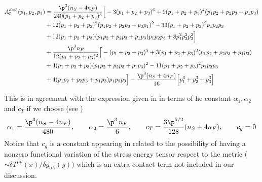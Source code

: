 \documentclass[a4paper,11pt,openright,twoside]{book}
\let\a=\alpha   \let\b=\beta   \let\g=\gamma   \let\d=\delta
\numberwithin{equation}{section}
\begin{document}
{{\begin{align}
	A_{5}^{d=3}(p_1,p_2,p_3)&=\frac{\p^3(n_S-4n_F)}{240(p_1+p_2+p_3)^3}\Big[-3(p_1+p_2+p_3)^6+9(p_1+p_2+p_3)^4(p_1 p_2+p_2 p_3+p_1 p_3)\notag\\
	&+12(p_1+p_2+p_3)^2(p_1 p_2+p_2p_3+p_3 p_1)^2-33(p_1+p_2+p_3)^2p_1p_2p_3\notag\\
	&+12(p_1+p_2+p_3)(p_1p_2+p_2p_3+p_1p_3)p_1p_2p_3+8p_1^2p_2^2p_3^2\Big]\notag\\
	&+\frac{\p^3n_F}{12(p_1+p_2+p_3)^2}\Big[-(p_1+p_2+p_3)^5+3(p_1+p_2+p_3)^3(p_1p_2+p_2p_3+p_1p_3)\notag\\
	&+4(p_1+p_2+p_3)(p_1p_2+p_2p_3+p_1p_3)^2-11(p_1+p_2+p_3)^2p_1p_2p_3\notag\\
	&+4(p_1p_2+p_2p_3+p_1p_3)p_1p_2p_3\Big]-\frac{\p^3(n_S+4n_F)}{16}\Big[p_1^3+p_2^3+p_3^3\Big]
\end{align}

This is in agreement with the expression given in \cite{Bzowski:2013sza} in terms of he constant $\a_1,\a_2$ and $c_T$ if we choose 
(see \cite{Bzowski:2013sza})
\begin{align}
	\a_1=\frac{\p^3(n_S-4n_F)}{480}, \qquad \a_2=\frac{\p^3\,n_F}{6}, \qquad c_T=\frac{3\p^{5/2}}{128}(n_S+4n_F), \qquad c_g=0 
\end{align}
Notice that $c_g$ is a constant appearing in \cite{Bzowski:2013sza} related to the possibility of having a nonzero functional variation of the stress energy tensor respect to the metric ($\sim \delta T^{\mu\nu}(x)/\delta g_{\alpha\beta}(y))$ which is an extra contact term not included in our discussion.


}}
\end{document}
